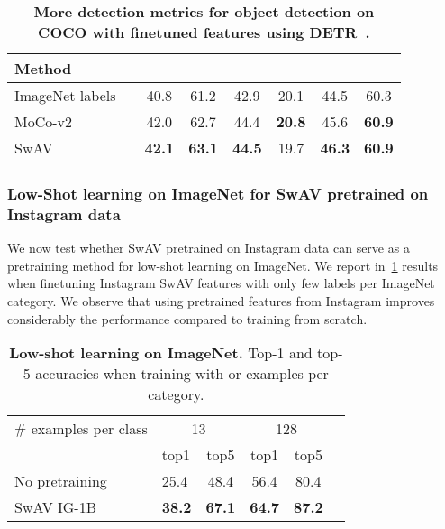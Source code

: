 \documentclass{article}
\def\OURS{SwAV\xspace}
\newcommand{\ImNet}{ImageNet\xspace}
\begin{document}
\begin{table}[h]
\centering
  \caption{
\textbf{More detection metrics for object detection on COCO with finetuned features using DETR~\cite{carion2020end}.}
}
\vspace{.3em}
\begin{tabular}{ll c c c c c c}
    \toprule
	  Method &&  &  &  &  &  &  \\
    \midrule
	\ImNet labels && 40.8 & 61.2 & 42.9 & 20.1 & 44.5 & 60.3 \\
    \midrule
	MoCo-v2 && 42.0 & 62.7 & 44.4 & \bf 20.8 & 45.6 & \bf 60.9 \\
	\OURS && \bf 42.1 & \bf 63.1 & \bf 44.5 & 19.7 & \bf 46.3 & \bf 60.9 \\
    \bottomrule
  \end{tabular}
  \label{tab:detr}
\end{table}

\subsubsection{Low-Shot learning on ImageNet for \OURS pretrained on Instagram data}
We now test whether \OURS pretrained on Instagram data can serve as a pretraining method for low-shot learning on ImageNet.
We report in~\cref{tab:detr} results when finetuning Instagram \OURS features with only few labels per ImageNet category.
We observe that using pretrained features from Instagram improves considerably the performance compared to training from scratch.
\begin{table}[h]
  \caption{
\textbf{Low-shot learning on ImageNet.} Top-1 and top-5 accuracies when training with  or  examples per category.
}
\vspace{.3em}
  \label{tab:semisup}
\centering
\begin{tabular}{ll c c c c}
    \toprule
	  \# examples per class & \multicolumn{2}{c}{13} & \multicolumn{2}{c}{128} \\
	  & top1 & top5 & top1 & top5 \\
    \midrule
	No pretraining & 25.4 & 48.4 & 56.4 & 80.4 \\
    \midrule
\OURS IG-1B & \bf 38.2  & \bf 67.1  & \bf 64.7 & \bf 87.2 \\
    \bottomrule
  \end{tabular}
\end{table}
\end{document}

